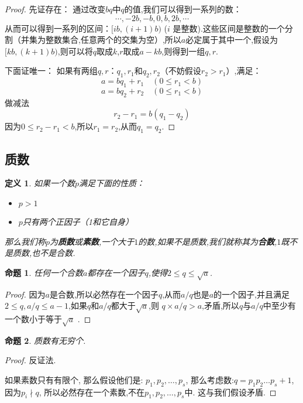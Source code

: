 \documentclass{article}
\newtheorem{definition}{定义}
\newtheorem{prop}{命题}
\begin{document}
		\begin{proof}
			先证存在：
			通过改变$ bq $中$ q $的值,我们可以得到一系列的数：
			$$
			\cdots, -2b, -b, 0, b, 2b, \cdots
			$$
			从而可以得到一系列的区间：$ [ib,(i+1)b) $ ($ i $ 是整数).这些区间是整数的一个分割（并集为整数集合,任意两个的交集为空）,所以$ a $必定属于其中一个,假设为$ [kb,(k+1)b) $,则可以将$ q $取成$ k $,$ r $取成$ a - kb $,则得到一组$ q, r $.
			
			下面证唯一：
			如果有两组$ q,r $：$q_1,r_1$和$q_2,r_2$（不妨假设$r_2 > r_1$）,满足：
			$$ a = b q_1 + r_1  \quad (0 \leq r_1 < b)$$
			$$ a = b q_2 + r_2  \quad (0 \leq r_1 < b)$$
			做减法
			$$ r_2 -  r_1 = b (q_1 - q_2) $$
			因为$ 0 \leq r_2 - r_1 < b$,所以$r_1 = r_2$,从而$q_1 = q_2$.
		\end{proof}

	\subsection{质数}
		
		\begin{definition}
			如果一个数$ p $满足下面的性质：
			\begin{itemize}
				\item $p > 1$
				\item $ p $只有两个正因子（1和它自身）
			\end{itemize}
			那么我们称$ p $为\textbf{质数}或\textbf{素数},一个大于$ 1 $的数,如果不是质数,我们就称其为\textbf{合数},$ 1 $既不是质数,也不是合数.
		\end{definition}
		
		\begin{prop}
			任何一个合数$ a $都存在一个因子$ q $,使得$2 \leq q \leq \sqrt{a}$.
		\end{prop}
	
		\begin{proof}
			因为$ a $是合数,所以必然存在一个因子$ q $,从而$ a/q $也是$ a $的一个因子,并且满足$2 \leq q, a/q \leq a-1$,如果$ q $和$ a/q $都大于$\sqrt{a}$,则
			$q \times a/q > a$,矛盾,所以$ q $与$ a/q $中至少有一个数小于等于$\sqrt{a}$ .
		\end{proof}
		
		\begin{prop}
			质数有无穷个.
		\end{prop}
		
		\begin{proof}
			反证法.
			
			如果素数只有有限个, 那么假设他们是: $ p_1, p_2, \dots , p_s $, 那么考虑数:$ q = p_1p_2\dots p_s + 1$, 因为$ p_i \nmid q $, 所以必然存在一个素数,不在$ p_1, p_2, \dots , p_s $中. 这与我们假设矛盾.
		\end{proof}
	
\end{document}
